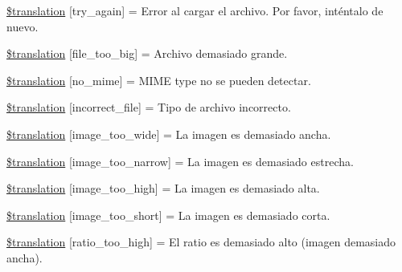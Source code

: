 \begin{DoxyCompactItemize}
\item 
\hyperlink{class_8upload_8es___e_s_8php_a3afc377bd803683314f413a814243066}{\$translation} \mbox{[}\textquotesingle{}try\+\_\+again\textquotesingle{}\mbox{]} = \textquotesingle{}Error al cargar el archivo. Por favor, inténtalo de nuevo.\textquotesingle{}
\item 
\hyperlink{class_8upload_8es___e_s_8php_a476278eb4a0c3df56af068e2d511a741}{\$translation} \mbox{[}\textquotesingle{}file\+\_\+too\+\_\+big\textquotesingle{}\mbox{]} = \textquotesingle{}Archivo demasiado grande.\textquotesingle{}
\item 
\hyperlink{class_8upload_8es___e_s_8php_a191a55df8e3bb7f3c51b70f3c1932e02}{\$translation} \mbox{[}\textquotesingle{}no\+\_\+mime\textquotesingle{}\mbox{]} = \textquotesingle{}M\+I\+M\+E type no se pueden detectar.\textquotesingle{}
\item 
\hyperlink{class_8upload_8es___e_s_8php_a4d32343e2699edd6fd435f9c832cb9c7}{\$translation} \mbox{[}\textquotesingle{}incorrect\+\_\+file\textquotesingle{}\mbox{]} = \textquotesingle{}Tipo de archivo incorrecto.\textquotesingle{}
\item 
\hyperlink{class_8upload_8es___e_s_8php_a0dd3e4930ca1f59ae280f4b1006525cd}{\$translation} \mbox{[}\textquotesingle{}image\+\_\+too\+\_\+wide\textquotesingle{}\mbox{]} = \textquotesingle{}La imagen es demasiado ancha.\textquotesingle{}
\item 
\hyperlink{class_8upload_8es___e_s_8php_a5c9a4cd67fd21c32e0a3b434591a6037}{\$translation} \mbox{[}\textquotesingle{}image\+\_\+too\+\_\+narrow\textquotesingle{}\mbox{]} = \textquotesingle{}La imagen es demasiado estrecha.\textquotesingle{}
\item 
\hyperlink{class_8upload_8es___e_s_8php_aa27bde361343f3b63c7cd441860024f8}{\$translation} \mbox{[}\textquotesingle{}image\+\_\+too\+\_\+high\textquotesingle{}\mbox{]} = \textquotesingle{}La imagen es demasiado alta.\textquotesingle{}
\item 
\hyperlink{class_8upload_8es___e_s_8php_a86fcd4e1157b00032df451188d735527}{\$translation} \mbox{[}\textquotesingle{}image\+\_\+too\+\_\+short\textquotesingle{}\mbox{]} = \textquotesingle{}La imagen es demasiado corta.\textquotesingle{}
\item 
\hyperlink{class_8upload_8es___e_s_8php_a23396f6ce7f31e5e5f1b57580621d982}{\$translation} \mbox{[}\textquotesingle{}ratio\+\_\+too\+\_\+high\textquotesingle{}\mbox{]} = \textquotesingle{}El ratio es demasiado alto (imagen demasiado ancha).\textquotesingle{}
\item 

\end{DoxyCompactItemize}
